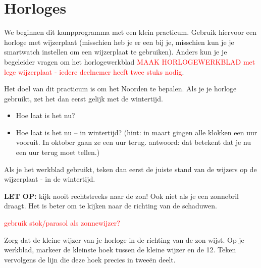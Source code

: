 \section{Horloges}

We beginnen dit kampprogramma met een klein practicum. Gebruik hiervoor een horloge met wijzerplaat (misschien heb je er een bij je, misschien kun je je smartwatch instellen om een wijzerplaat te gebruiken). Anders kun je je begeleider vragen om het horlogewerkblad \textcolor{red}{MAAK HORLOGEWERKBLAD met lege wijzerplaat - iedere deelnemer heeft twee stuks nodig}.

Het doel van dit practicum is om het Noorden te bepalen. Als je je horloge gebruikt, zet het dan eerst gelijk met de wintertijd.

\begin{itemize}
\item Hoe laat is het nu?
\item Hoe laat is het nu -- in wintertijd? (hint: in maart gingen alle klokken een uur vooruit. In oktober gaan ze een uur terug. antwoord: dat betekent dat je nu een uur terug moet tellen.)
\end{itemize}

Als je het werkblad gebruikt, teken dan eerst de juiste stand van de wijzers op de wijzerplaat - in de wintertijd.

\textbf{LET OP:} kijk nooit rechtstreeks naar de zon! Ook niet als je een zonnebril draagt. Het is beter om te kijken naar de richting van de schaduwen.

\textcolor{red}{gebruik stok/parasol als zonnewijzer?}

Zorg dat de kleine wijzer van je horloge in de richting van de zon wijst. Op je werkblad, markeer de kleinste hoek tussen de kleine wijzer en de 12. Teken vervolgens de lijn die deze hoek precies in twee\"{e}n deelt.


